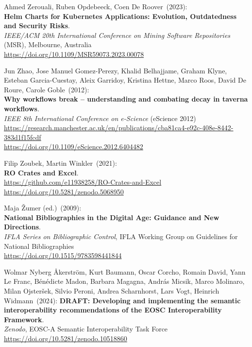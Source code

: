 \begin{thebibliography}{9}
Ahmed Zerouali, Ruben Opdebeeck, Coen De Roover~(2023):\\
\textbf{Helm Charts for Kubernetes Applications: Evolution, Outdatedness and Security Risks}.\\
\emph{IEEE/ACM 20th International Conference on Mining Software Repositories} (MSR), Melbourne, Australia \\
\url{https://doi.org/10.1109/MSR59073.2023.00078}

Jun Zhao, Jose Manuel Gomez-Perezy, Khalid Belhajjame, Graham Klyne, Esteban Garcia-Cuestay, Aleix Garridoy, Kristina Hettne, Marco Roos, David De Roure, Carole Goble~(2012): \\
\textbf{Why workflows break -- understanding and combating decay in taverna workflows}.\\
\emph{IEEE 8th International Conference on e-Science} (eScience 2012)\\
\url{https://research.manchester.ac.uk/en/publications/cba81ca4-e92c-408e-8442-383d1f15fcdf}\\
\url{https://doi.org/10.1109/eScience.2012.6404482}

Filip Zoubek, Martin Winkler~(2021): \\
\textbf{RO Crates and Excel}.\\
\url{https://github.com/e11938258/RO-Crates-and-Excel}\\
\url{https://doi.org/10.5281/zenodo.5068950}

Maja Žumer (ed.)~(2009): \\
\textbf{National Bibliographies in the Digital Age: Guidance and New Directions}.\\
\emph{IFLA Series on Bibliographic Control}, IFLA Working Group on
Guidelines for National Bibliographies\\
\url{https://doi.org/10.1515/9783598441844}

Wolmar Nyberg Åkerström, Kurt Baumann, Oscar Corcho, Romain David, Yann Le Franc, Bénédicte Madon, Barbara Magagna, András Micsik, Marco Molinaro, Milan Ojsteršek, Silvio Peroni, Andrea Scharnhorst, Lars Vogt, Heinrich Widmann~(2024):  
\textbf{DRAFT: Developing and implementing the semantic interoperability recommendations of the EOSC Interoperability Framework}.\\
\emph{Zenodo}, EOSC-A Semantic Interoperability Task Force \\
\url{https://doi.org/10.5281/zenodo.10518860}

\end{thebibliography}

\makeatother

